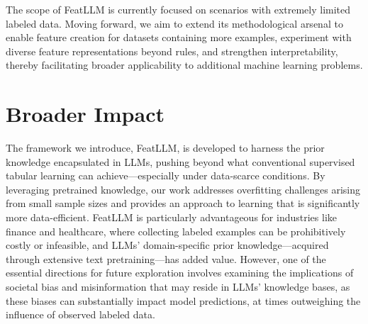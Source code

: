 The scope of \textsf{FeatLLM} is currently focused on scenarios with extremely limited labeled data. Moving forward, we aim to extend its methodological arsenal to enable feature creation for datasets containing more examples, experiment with diverse feature representations beyond rules, and strengthen interpretability, thereby facilitating broader applicability to additional machine learning problems.

\section{Broader Impact}
The framework we introduce, \textsf{FeatLLM}, is developed to harness the prior knowledge encapsulated in LLMs, pushing beyond what conventional supervised tabular learning can achieve—especially under data-scarce conditions. By leveraging pretrained knowledge, our work addresses overfitting challenges arising from small sample sizes and provides an approach to learning that is significantly more data-efficient. \textsf{FeatLLM} is particularly advantageous for industries like finance and healthcare, where collecting labeled examples can be prohibitively costly or infeasible, and LLMs’ domain-specific prior knowledge—acquired through extensive text pretraining—has added value. However, one of the essential directions for future exploration involves examining the implications of societal bias and misinformation that may reside in LLMs’ knowledge bases, as these biases can substantially impact model predictions, at times outweighing the influence of observed labeled data.

